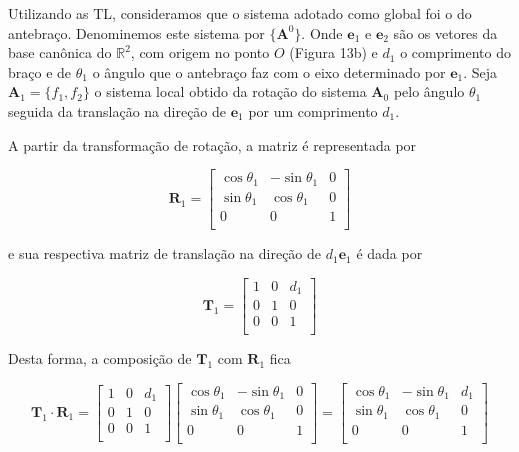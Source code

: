 Utilizando as TL, consideramos que o sistema adotado como global foi o do antebraço. Denominemos este sistema por $\{\mathbf{A}^0\}$. Onde $\mathbf{e}_1$ e $\mathbf{e}_2$ são os vetores da base canônica do $\mathbb{R}^2$, com origem no ponto $O$ (Figura 13b) e $d_1$ o comprimento do braço e de $\theta_1$ o ângulo que o antebraço faz com o eixo determinado por $\mathbf{e}_1$. Seja $\mathbf{A}_1 = \{f_1, f_2\}$ o sistema local obtido da rotação do sistema $\mathbf{A}_0$ pelo ângulo $\theta_1$ seguida da translação na direção de $\mathbf{e}_1$ por um comprimento $d_1$.

A partir da transformação de rotação, a matriz é representada por

\[
\mathbf{R}_1 = \begin{bmatrix}
	\cos\theta_1 & -\sin\theta_1 & 0\\
	 \sin\theta_1 & \cos\theta_1 & 0\\
	 0 & 0 & 1\\
\end{bmatrix}
\]

\noindent e sua respectiva matriz de translação na direção de $d_1\mathbf{e}_1$ é dada por

\[
\mathbf{T}_1 = \begin{bmatrix}
	1 & 0 & d_1\\
	0 & 1 & 0\\
	0 & 0 & 1\\
\end{bmatrix}
\]

Desta forma, a composição de $\mathbf{T}_1$ com $\mathbf{R}_1$ fica

\[
\mathbf{T}_1\cdot\mathbf{R}_1 = \begin{bmatrix}
	1 & 0 & d_1\\
	0 & 1 & 0\\
	0 & 0 & 1\\
\end{bmatrix}
\begin{bmatrix}
	\cos\theta_1 & -\sin\theta_1 & 0\\
	\sin\theta_1 & \cos\theta_1 & 0\\
	0 & 0 & 1\\
\end{bmatrix}
=
\begin{bmatrix}
	\cos\theta_1 & -\sin\theta_1 & d_1\\
	\sin\theta_1 & \cos\theta_1 & 0\\
	0 & 0 & 1\\
\end{bmatrix}
\]

